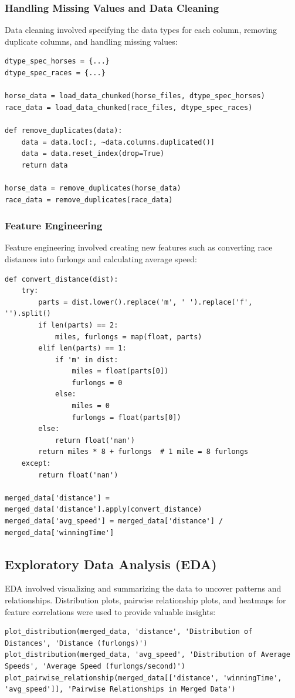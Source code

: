 \documentclass{article}
\begin{document}
\subsubsection*{Handling Missing Values and Data Cleaning}
Data cleaning involved specifying the data types for each column, removing duplicate columns, and handling missing values:
\begin{verbatim}
dtype_spec_horses = {...}
dtype_spec_races = {...}

horse_data = load_data_chunked(horse_files, dtype_spec_horses)
race_data = load_data_chunked(race_files, dtype_spec_races)

def remove_duplicates(data):
    data = data.loc[:, ~data.columns.duplicated()]
    data = data.reset_index(drop=True)
    return data

horse_data = remove_duplicates(horse_data)
race_data = remove_duplicates(race_data)
\end{verbatim}

\subsubsection*{Feature Engineering}
Feature engineering involved creating new features such as converting race distances into furlongs and calculating average speed:
\begin{verbatim}
def convert_distance(dist):
    try:
        parts = dist.lower().replace('m', ' ').replace('f', '').split()
        if len(parts) == 2:
            miles, furlongs = map(float, parts)
        elif len(parts) == 1:
            if 'm' in dist:
                miles = float(parts[0])
                furlongs = 0
            else:
                miles = 0
                furlongs = float(parts[0])
        else:
            return float('nan')
        return miles * 8 + furlongs  # 1 mile = 8 furlongs
    except:
        return float('nan')

merged_data['distance'] = merged_data['distance'].apply(convert_distance)
merged_data['avg_speed'] = merged_data['distance'] / merged_data['winningTime']
\end{verbatim}

\subsection*{Exploratory Data Analysis (EDA)}
EDA involved visualizing and summarizing the data to uncover patterns and relationships. Distribution plots, pairwise relationship plots, and heatmaps for feature correlations were used to provide valuable insights:
\begin{verbatim}
plot_distribution(merged_data, 'distance', 'Distribution of Distances', 'Distance (furlongs)')
plot_distribution(merged_data, 'avg_speed', 'Distribution of Average Speeds', 'Average Speed (furlongs/second)')
plot_pairwise_relationship(merged_data[['distance', 'winningTime', 'avg_speed']], 'Pairwise Relationships in Merged Data')
\end{verbatim}
\end{document}
